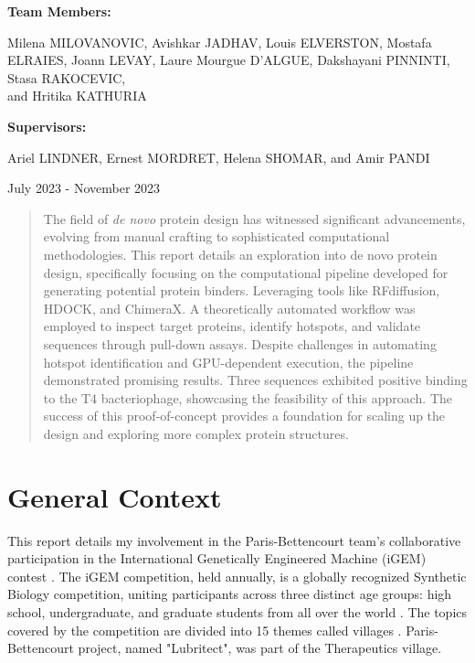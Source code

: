 \documentclass[11pt,a4paper]{article}
\begin{document}
\begin{titlepage}
    \textbf{Team Members:}
    
    Milena MILOVANOVIC, Avishkar JADHAV, Louis ELVERSTON, Mostafa ELRAIES, Joann LEVAY, Laure Mourgue D'ALGUE, Dakshayani PINNINTI, Stasa RAKOCEVIC, \\ and Hritika KATHURIA
    \vspace{0.5cm}
    
    \textbf{Supervisors:}

    Ariel LINDNER, Ernest MORDRET, Helena SHOMAR, and Amir PANDI

    \vfill

    {\large July 2023 - November 2023\par}
\end{titlepage}

\tableofcontents
\newpage

\begin{abstract}

    The field of \emph{de novo} protein design has witnessed significant advancements, evolving from manual crafting to sophisticated computational methodologies. This report details an exploration into de novo protein design, specifically focusing on the computational pipeline developed for generating potential protein binders. Leveraging tools like RFdiffusion, HDOCK, and ChimeraX. A theoretically automated workflow was employed to inspect target proteins, identify hotspots, and validate sequences through pull-down assays. Despite challenges in automating hotspot identification and GPU-dependent execution, the pipeline demonstrated promising results. Three sequences exhibited positive binding to the T4 bacteriophage, showcasing the feasibility of this approach. The success of this proof-of-concept provides a foundation for scaling up the design and exploring more complex protein structures.
    
\end{abstract}

\section{General Context}

This report details my involvement in the Paris-Bettencourt team's 
collaborative participation in the International Genetically Engineered 
Machine (iGEM) contest \cite{igem_main}. The iGEM competition, held annually, 
is a globally recognized Synthetic Biology competition, uniting 
participants across three distinct age groups: high school, 
undergraduate, and graduate students from all over the world
\cite{igem_description}.
The topics covered by the competition are divided into 15 themes called villages \cite{igem_villages}.
Paris-Bettencourt project, named "Lubritect", was part of the Therapeutics village.
\end{document}
